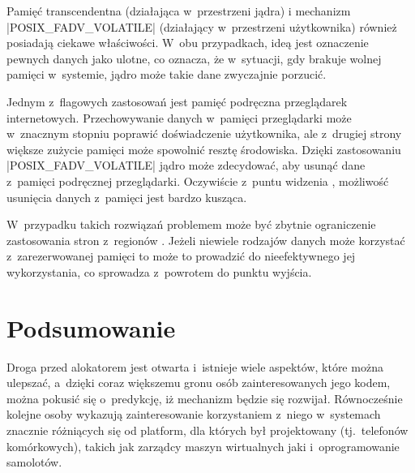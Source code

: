 Pamięć transcendentna \autocite{bib:transcendent} (działająca
w~przestrzeni jądra) i mechanizm \code|POSIX_FADV_VOLATILE|
\autocite{bib:fadv-volatile} (działający w~przestrzeni użytkownika)
również posiadają ciekawe właściwości.  W~obu przypadkach, ideą jest
oznaczenie pewnych danych jako ulotne, co oznacza, że w~sytuacji, gdy
brakuje wolnej pamięci w~systemie, jądro może takie dane zwyczajnie
porzucić.

Jednym z~flagowych zastosowań jest pamięć podręczna przeglądarek
internetowych.  Przechowywanie danych w~pamięci przeglądarki może
w~znacznym stopniu poprawić doświadczenie użytkownika, ale z~drugiej strony większe zużycie pamięci może spowolnić
resztę środowiska.  Dzięki zastosowaniu \code|POSIX_FADV_VOLATILE|
jądro może zdecydować, aby usunąć dane z~pamięci podręcznej
przeglądarki.  Oczywiście z~puntu widzenia , możliwość
usunięcia danych z~pamięci jest bardzo kusząca.

W~przypadku takich rozwiązań problemem może być zbytnie ograniczenie
zastosowania stron z~regionów .  Jeżeli niewiele rodzajów danych
może korzystać z~zarezerwowanej pamięci to może to prowadzić do
nieefektywnego jej wykorzystania, co sprowadza  z~powrotem do
punktu wyjścia.

\section{Podsumowanie}

Droga przed alokatorem  jest otwarta i~istnieje wiele
aspektów, które można ulepszać, a~dzięki coraz większemu gronu osób
zainteresowanych jego kodem, można pokusić się o~predykcję, iż
mechanizm  będzie się rozwijał.  Równocześnie kolejne osoby
wykazują zainteresowanie korzystaniem z~niego w~systemach znacznie
różniących się od platform, dla których był projektowany
(tj.\ telefonów komórkowych), takich jak zarządcy maszyn wirtualnych
jaki i~oprogramowanie samolotów.
